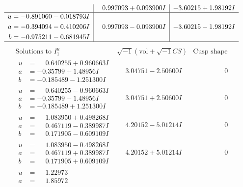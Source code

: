 \documentclass[1p]{elsarticle_modified}
\theoremstyle{definition}
\newcommand{\I}{\sqrt{-1}}
\begin{document}
$$\begin{array}{c|c|c}
 & \phantom{-}0.997093 + 0.093900 I & -3.60215 + 1.98192 I \\ \hline\begin{aligned}
u &= -0.891060 - 0.018793 I \\
a &= -0.394094 - 0.410206 I \\
b &= -0.975211 - 0.681945 I\end{aligned}
 & \phantom{-}0.997093 - 0.093900 I & -3.60215 - 1.98192 I\\
 \hline 
 \end{array}$$\newpage$$\begin{array}{c|c|c}  
\text{Solutions to }I^u_{1}& \I (\text{vol} + \sqrt{-1}CS) & \text{Cusp shape}\\
 \hline 
\begin{aligned}
u &= \phantom{-}0.640255 + 0.960663 I \\
a &= -0.35799 + 1.48956 I \\
b &= -0.185489 - 1.251300 I\end{aligned}
 & \phantom{-}3.04751 - 2.50600 I & \phantom{-0.000000 } 0 \\ \hline\begin{aligned}
u &= \phantom{-}0.640255 - 0.960663 I \\
a &= -0.35799 - 1.48956 I \\
b &= -0.185489 + 1.251300 I\end{aligned}
 & \phantom{-}3.04751 + 2.50600 I & \phantom{-0.000000 } 0 \\ \hline\begin{aligned}
u &= \phantom{-}1.083950 + 0.498268 I \\
a &= \phantom{-}0.467119 - 0.389987 I \\
b &= \phantom{-}0.171905 - 0.609109 I\end{aligned}
 & \phantom{-}4.20152 - 5.01214 I & \phantom{-0.000000 } 0 \\ \hline\begin{aligned}
u &= \phantom{-}1.083950 - 0.498268 I \\
a &= \phantom{-}0.467119 + 0.389987 I \\
b &= \phantom{-}0.171905 + 0.609109 I\end{aligned}
 & \phantom{-}4.20152 + 5.01214 I & \phantom{-0.000000 } 0 \\ \hline\begin{aligned}
u &= \phantom{-}1.22973\phantom{ +0.000000I} \\
a &= \phantom{-}1.85972\phantom{ +0.000000I} \\

\end{aligned}
\end{array}$$
\end{document}
